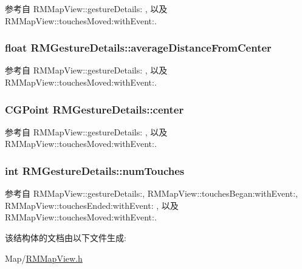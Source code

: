 参考自 R\-M\-Map\-View\-::gesture\-Details\-: , 以及 R\-M\-Map\-View\-::touches\-Moved\-:with\-Event\-:.

\hypertarget{struct_r_m_gesture_details_a2c074c58329f5a730c2cbe5f99c28e24}{
\subsubsection[{average\-Distance\-From\-Center}]{\setlength{\rightskip}{0pt plus 5cm}float R\-M\-Gesture\-Details\-::average\-Distance\-From\-Center}}\label{struct_r_m_gesture_details_a2c074c58329f5a730c2cbe5f99c28e24}


参考自 R\-M\-Map\-View\-::gesture\-Details\-: , 以及 R\-M\-Map\-View\-::touches\-Moved\-:with\-Event\-:.

\hypertarget{struct_r_m_gesture_details_ab46d774b19e402ea75f1f4af23fe53ca}{
\subsubsection[{center}]{\setlength{\rightskip}{0pt plus 5cm}C\-G\-Point R\-M\-Gesture\-Details\-::center}}\label{struct_r_m_gesture_details_ab46d774b19e402ea75f1f4af23fe53ca}


参考自 R\-M\-Map\-View\-::gesture\-Details\-: , 以及 R\-M\-Map\-View\-::touches\-Moved\-:with\-Event\-:.

\hypertarget{struct_r_m_gesture_details_a7efc4ebc12eed19c8155c2aea2131cf9}{
\subsubsection[{num\-Touches}]{\setlength{\rightskip}{0pt plus 5cm}int R\-M\-Gesture\-Details\-::num\-Touches}}\label{struct_r_m_gesture_details_a7efc4ebc12eed19c8155c2aea2131cf9}


参考自 R\-M\-Map\-View\-::gesture\-Details\-:, R\-M\-Map\-View\-::touches\-Began\-:with\-Event\-:, R\-M\-Map\-View\-::touches\-Ended\-:with\-Event\-: , 以及 R\-M\-Map\-View\-::touches\-Moved\-:with\-Event\-:.



该结构体的文档由以下文件生成\-:\begin{DoxyCompactItemize}
\item 
Map/\hyperlink{_r_m_map_view_8h}{R\-M\-Map\-View.\-h}\end{DoxyCompactItemize}
